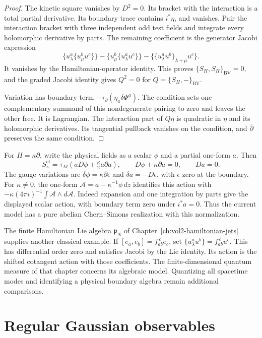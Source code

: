 \begin{proof}
The kinetic square vanishes by \(D^2=0\). Its bracket with the interaction
is a total partial derivative. Its boundary trace contains \(i^*\eta\),
and vanishes. Pair the interaction bracket with three independent odd
test fields and integrate every holomorphic derivative by parts.
The remaining coefficient is the generator Jacobi expression
\[
 \{u^a_\lambda\{u^b_\mu u^c\}\}
 -\{u^b_\mu\{u^a_\lambda u^c\}\}
 -\{\{u^a_\lambda u^b\}_{\lambda+\mu}u^c\}.
\]
It vanishes by the Hamiltonian-operator identity. This proves
\(\{S_H,S_H\}_{\mathrm{BV}}=0\), and the graded Jacobi identity gives
\(Q^2=0\) for \(Q=\{S_H,-\}_{\mathrm{BV}}\).

Variation has boundary term
\(-\tau_\partial(\eta_a\delta\Phi^a)\).
The condition sets one complementary summand of this nondegenerate
pairing to zero and leaves the other free. It is Lagrangian.
The interaction part of \(Q\eta\) is quadratic in \(\eta\) and its
holomorphic derivatives. Its tangential pullback vanishes on the condition,
and \(\bar\partial\) preserves the same condition.
\end{proof}

For \(H=\kappa\partial\), write the physical fields as a scalar \(\phi\)
and a partial one-form \(a\). Then
\[
 S^{\mathrm{cl}}_\kappa=\tau_M\left(aD\phi+\tfrac\kappa2a\partial a\right),
 \qquad
 D\phi+\kappa\partial a=0,\qquad Da=0.
\]
The gauge variations are \(\delta\phi=\kappa\partial\epsilon\) and
\(\delta a=-D\epsilon\), with \(\epsilon\) zero at the boundary.
For \(\kappa\ne0\), the one-form
\(\mathcal A=a-\kappa^{-1}\phi\,dz\) identifies this action with
\(-\kappa(4\pi i)^{-1}\int\mathcal A\wedge d\mathcal A\).
Indeed expansion and one integration by parts give the displayed scalar
action, with boundary term zero under \(i^*a=0\). Thus the current model
has a pure abelian Chern--Simons realization with this normalization.

The finite Hamiltonian Lie algebra \(\mathfrak p_N\) of
Chapter~\ref{ch:vol2-hamiltonian-jets} supplies another classical example.
If \([e_a,e_b]=f_{ab}^{\ c}e_c\), set
\(\{u^a_\lambda u^b\}=f_{ab}^{\ c}u^c\).
This has differential order zero and satisfies Jacobi by the Lie identity.
Its action is the shifted cotangent action with those coefficients.
The finite-dimensional quantum measure of that chapter concerns its
algebraic model. Quantizing all spacetime modes and identifying a physical
boundary algebra remain additional comparisons.

\section{Regular Gaussian observables}

